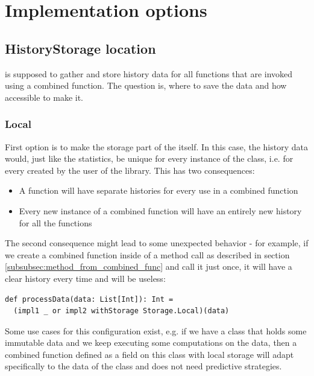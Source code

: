 \section{Implementation options}

\subsection{HistoryStorage location}
\label{subsec:storing}

 is supposed to gather and store history data for all functions that are invoked using a combined function. The question is, where to save the data and how accessible to make it.

\subsubsection{Local}

First option is to make the storage part of the  itself. In this case, the history data would, just like the statistics, be unique for every instance of the class, i.e. for every  created by the user of the library. This has two consequences:

\begin{itemize}
	\item A function will have separate histories for every use in a combined function
	\item Every new instance of a combined function will have an entirely new history for all the functions
\end{itemize}

The second consequence might lead to some unexpected behavior - for example, if we create a combined function inside of a method call as described in section \ref{subsubsec:method_from_combined_func} and call it just once, it will have a clear history every time and will be useless:

\lstset{style=Scala}
\begin{lstlisting}
def processData(data: List[Int]): Int = 
  (impl1 _ or impl2 withStorage Storage.Local)(data)
\end{lstlisting}

Some use cases for this configuration exist, e.g. if we have a class that holds some immutable data and we keep executing some computations on the data, then a combined function defined as a field on this class with local storage will adapt specifically to the data of the class and does not need predictive strategies.

